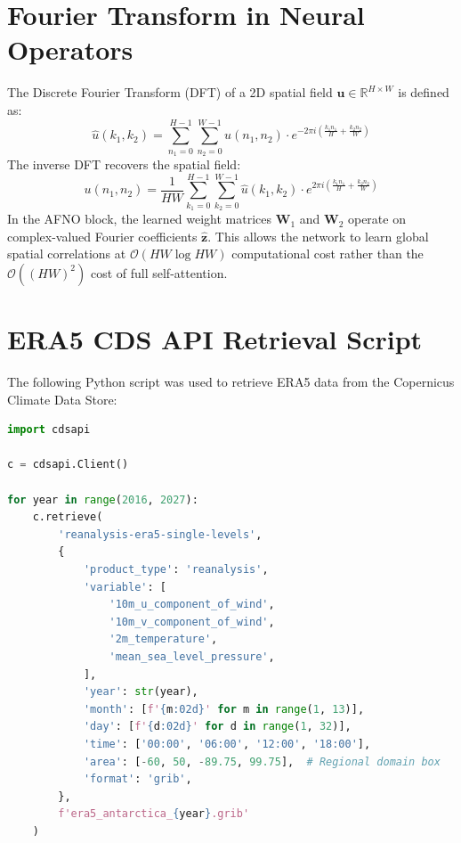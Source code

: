 \documentclass[12pt,titlepage,a4paper]{report}
\begin{document}
\appendix
\chapter{Fourier Transform in Neural Operators}
The Discrete Fourier Transform (DFT) of a 2D spatial field $\mathbf{u} \in \mathbb{R}^{H \times W}$ is defined as:
\begin{equation}
    \hat{u}(k_1, k_2) = \sum_{n_1=0}^{H-1} \sum_{n_2=0}^{W-1} u(n_1, n_2) \cdot e^{-2\pi i\left( \frac{k_1 n_1}{H} + \frac{k_2 n_2}{W} \right)}
\end{equation}
The inverse DFT recovers the spatial field:
\begin{equation}
    u(n_1, n_2) = \frac{1}{HW} \sum_{k_1=0}^{H-1} \sum_{k_2=0}^{W-1} \hat{u}(k_1, k_2) \cdot e^{2\pi i\left( \frac{k_1 n_1}{H} + \frac{k_2 n_2}{W} \right)}
\end{equation}
In the AFNO block, the learned weight matrices $\mathbf{W}_1$ and $\mathbf{W}_2$ operate on complex-valued Fourier coefficients $\hat{\mathbf{z}}$. This allows the network to learn global spatial correlations at $\mathcal{O}(HW \log HW)$ computational cost rather than the $\mathcal{O}((HW)^2)$ cost of full self-attention.

\chapter{ERA5 CDS API Retrieval Script}
The following Python script was used to retrieve ERA5 data from the Copernicus Climate Data Store:
\begin{lstlisting}[language=Python]
import cdsapi

c = cdsapi.Client()

for year in range(2016, 2027):
    c.retrieve(
        'reanalysis-era5-single-levels',
        {
            'product_type': 'reanalysis',
            'variable': [
                '10m_u_component_of_wind',
                '10m_v_component_of_wind',
                '2m_temperature',
                'mean_sea_level_pressure',
            ],
            'year': str(year),
            'month': [f'{m:02d}' for m in range(1, 13)],
            'day': [f'{d:02d}' for d in range(1, 32)],
            'time': ['00:00', '06:00', '12:00', '18:00'],
            'area': [-60, 50, -89.75, 99.75],  # Regional domain box
            'format': 'grib',
        },
        f'era5_antarctica_{year}.grib'
    )
\end{lstlisting}
\end{document}
